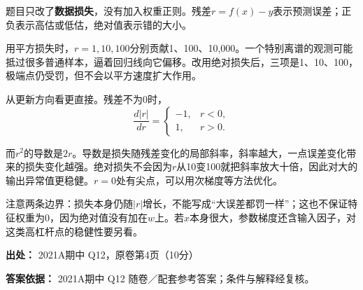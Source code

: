 题目只改了\textbf{数据损失}，没有加入权重正则。残差\(r=f(x)-y\)表示预测误差；正负表示高估或低估，绝对值表示错的大小。


用平方损失时，\(r=1,10,100\)分别贡献1、100、10,000。一个特别离谱的观测可能抵过很多普通样本，逼着回归线向它偏移。改用绝对损失后，三项是1、10、100，极端点仍受罚，但不会以平方速度扩大作用。


从更新方向看更直接。残差不为0时，
\[
\frac{d|r|}{dr}=\begin{cases}-1,&r<0,\\1,&r>0.\end{cases}
\]


而\(r^2\)的导数是\(2r\)。导数是损失随残差变化的局部斜率，斜率越大，一点误差变化带来的损失变化越强。绝对损失不会因为\(r\)从10变100就把斜率放大十倍，因此对大的输出异常值更稳健。\(r=0\)处有尖点，可以用次梯度等方法优化。


注意两条边界：损失本身仍随\(|r|\)增长，不能写成“大误差都罚一样”；这也不保证特征权重为0，因为绝对值没有加在\(w\)上。若\(x\)本身很大，参数梯度还含输入因子，对这类高杠杆点的稳健性要另看。


\textbf{出处：} 2021A期中 Q12，原卷第4页（10分）


\textbf{答案依据：} 2021A期中 Q12 随卷／配套参考答案；条件与解释经复核。
